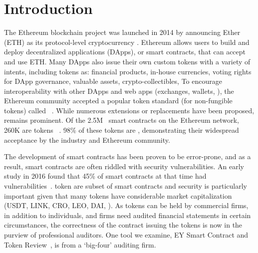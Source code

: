 
\section{Introduction}
\label{sect:introduction}

The Ethereum blockchain project was launched in 2014 by announcing Ether (ETH) as its protocol-level cryptocurrency \cite{EthGit,EIP150}. Ethereum allows users to build and deploy decentralized applications (DApps), or smart contracts, that can accept and use ETH. Many DApps also issue their own custom tokens with a variety of intents, including tokens as: financial products, in-house currencies, voting rights for DApp governance, valuable assets, crypto-collectibles, \etc To encourage interoperability with other DApps and web apps (exchanges, wallets, \etc), the Ethereum community accepted a popular token standard (for non-fungible tokens) called \erc~\cite{ERC20Std}. While numerous \erc extensions or replacements have been proposed, \erc remains prominent. Of the 2.5M~\cite{Alethio} smart contracts on the Ethereum network, 260K are tokens ~\cite{TokenTracker}. 98\% of these tokens are \erc\cite{EtherScan}, demonstrating their widespread acceptance by the industry and Ethereum community.

The development of smart contracts has been proven to be error-prone, and as a result, smart contracts are often riddled with security vulnerabilities. An early study in 2016 found that 45\% of smart contracts at that time had vulnerabilities~\cite{MakSm}. \erc token are subset of smart contracts and security is particularly important given that many tokens have considerable market capitalization (\eg USDT, LINK, CRO, LEO, DAI, \etc). As tokens can be held by commercial firms, in addition to individuals, and firms need audited financial statements in certain circumstances, the correctness of the contract issuing the tokens is now in the purview of professional auditors. One tool we examine, EY Smart Contract and Token Review~\cite{EYTool}, is from a `big-four' auditing firm. 


